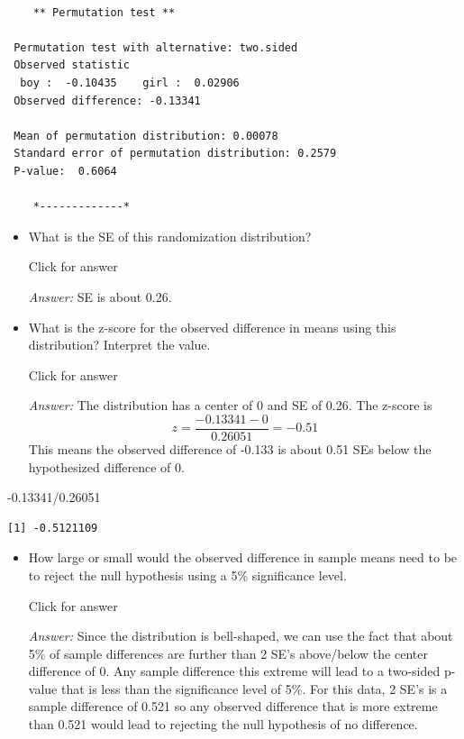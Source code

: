 \documentclass[
]{book}
\newenvironment{Shaded}{\begin{snugshade}}{\end{snugshade}}
\newcommand{\FloatTok}[1]{\textcolor[rgb]{0.00,0.00,0.81}{#1}}
\newcommand{\SpecialCharTok}[1]{\textcolor[rgb]{0.00,0.00,0.00}{#1}}
\providecommand{\tightlist}{%
  \setlength{\itemsep}{0pt}\setlength{\parskip}{0pt}}
\begin{document}
\begin{verbatim}

    ** Permutation test **

 Permutation test with alternative: two.sided 
 Observed statistic
  boy :  -0.10435    girl :  0.02906 
 Observed difference: -0.13341 

 Mean of permutation distribution: 0.00078 
 Standard error of permutation distribution: 0.2579 
 P-value:  0.6064 

    *-------------*
\end{verbatim}

\begin{itemize}
\tightlist
\item
  What is the SE of this randomization distribution?

  Click for answer

  \emph{Answer:} SE is about 0.26.
\end{itemize}

\begin{itemize}
\tightlist
\item
  What is the z-score for the observed difference in means using this distribution? Interpret the value.
  \vspace*{.5in}

  Click for answer

  \emph{Answer:} The distribution has a center of 0 and SE of 0.26. The z-score is
  \[
  z = \dfrac{-0.13341 - 0}{0.26051} = -0.51
  \]
  This means the observed difference of -0.133 is about 0.51 SEs below the hypothesized difference of 0.
\end{itemize}

\begin{Shaded}
\begin{Highlighting}[]
\SpecialCharTok{{-}}\FloatTok{0.13341}\SpecialCharTok{/}\FloatTok{0.26051} 
\end{Highlighting}
\end{Shaded}

\begin{verbatim}
[1] -0.5121109
\end{verbatim}

\begin{itemize}
\tightlist
\item
  How large or small would the observed difference in sample means need to be to reject the null hypothesis using a 5\% significance level.

  Click for answer

  \emph{Answer:} Since the distribution is bell-shaped, we can use the fact that about 5\% of sample differences are further than 2 SE's above/below the center difference of 0. Any sample difference this extreme will lead to a two-sided p-value that is less than the significance level of 5\%. For this data, 2 SE's is a sample difference of 0.521 so any observed difference that is more extreme than 0.521 would lead to rejecting the null hypothesis of no difference.
\end{itemize}
\end{document}

